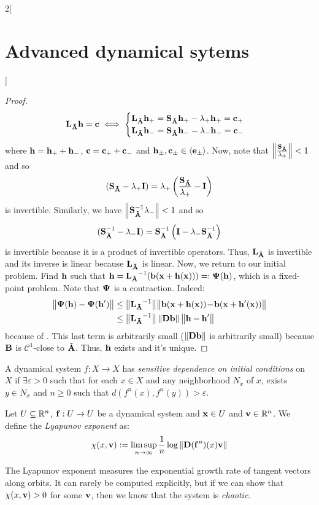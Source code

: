 \documentclass[../../../main_math.tex]{subfiles}
\begin{document}
\begin{multicols}{2}[\section{Advanced dynamical sytems}]
\begin{proof}
    $$
      \vf{L}_{\vf{\tilde{A}}}\vf{h}=\vf{c}\iff \begin{cases}
        \vf{L}_{\vf{\tilde{A}}}\vf{h}_+=\vf{S}_{\vf{\tilde{A}}}\vf{h}_+-\lambda_+\vf{h}_+=\vf{c}_+ \\
        \vf{L}_{\vf{\tilde{A}}}\vf{h}_-=\vf{S}_{\vf{\tilde{A}}}\vf{h}_--\lambda_-\vf{h}_-=\vf{c}_-
      \end{cases}
    $$
    where $\vf{h}=\vf{h}_++\vf{h}_-$, $\vf{c}=\vf{c}_++\vf{c}_-$ and $\vf{h}_\pm,\vf{c}_\pm\in \langle \vf{e}_\pm\rangle$. Now, note that $\norm{\frac{\vf{S}_{\vf{\tilde{A}}}}{\lambda_+}}<1$ and so
    $$
      (\vf{S}_{\vf{\tilde{A}}}-\lambda_+\vf{I})=\lambda_+\left(\frac{\vf{S}_{\vf{\tilde{A}}}}{\lambda_+}-\vf{I}\right)
    $$
    is invertible. Similarly, we have $\norm{\vf{S}_{\vf{\tilde{A}}}^{-1}\lambda_-}<1$ and so
    $$
      (\vf{S}_{\vf{\tilde{A}}}^{-1}-\lambda_-\vf{I})=\vf{S}_{\vf{\tilde{A}}}^{-1}\left(\vf{I}-\lambda_-\vf{S}_{\vf{\tilde{A}}}^{-1}\right)
    $$
    is invertible because it is a product of invertible operators. Thus, $\vf{L}_{\vf{\tilde{A}}}$ is invertible and its inverse is linear because $\vf{L}_{\vf{\tilde{A}}}$ is linear. Now, we return to our initial problem. Find $\vf{h}$ such that $\vf{h}= {\vf{L}_{\vf{\tilde{A}}}}^{-1}(\vf{b}(\vf{x}+\vf{h}(\vf{x})))=:\vf\Psi(\vf{h})$, which is a fixed-point problem. Note that $\vf\Psi$ is a contraction. Indeed:
    \begin{align*}
      \norm{\vf\Psi(\vf{h})-\vf\Psi(\vf{h}')} & \leq \norm{{\vf{L}_{\vf{\tilde{A}}}}^{-1}}\!\norm{\vf{b}(\vf{x}+\vf{h}(\vf{x}))\!-\!\vf{b}(\vf{x}+\vf{h}'(\vf{x}))} \\
                                              & \leq \norm{{\vf{L}_{\vf{\tilde{A}}}}^{-1}}\norm{\vf{Db}}\norm{\vf{h}-\vf{h}'}
    \end{align*}
    because of . This last term is arbitrarily small ($\norm{\vf{Db}}$ is arbitrarily small) because $\vf{B}$ is $\mathcal{C}^1$-close to $\vf{\tilde{A}}$. Thus, $\vf{h}$ exists and it's unique.
  \end{proof}
  \begin{definition}
    A dynamical system $f : X\rightarrow X$ has \emph{sensitive dependence on initial conditions} on $X$ if $\exists\varepsilon >0$ such that for each $x\in X$ and any neighborhood $N_x$ of $x$, exists $y \in N_x$ and $n \geq  0$ such that $d(f^n(x),f^n(y)) > \varepsilon$.
  \end{definition}
  \begin{definition}
    Let $U\subseteq \RR^n$, $\vf{f}:U\to U$ be a dynamical system and $\vf{x}\in U$ and $\vf{v}\in\RR^n$. We define the \emph{Lyapunov exponent} as:
    $$
      \chi(x,\vf{v}):=\limsup_{n\to\infty}\frac{1}{n}\log\norm{\vf{D}(\vf{f}^n)(x)\vf{v}}
    $$
  \end{definition}
  \begin{remark}
    The Lyapunov exponent measures the exponential growth rate of tangent vectors along orbits. It can rarely be computed explicitly, but if we can show that $\chi(x,\vf{v})>0$ for some $\vf{v}$, then we know that the system is \emph{chaotic}.
  \end{remark}

\end{multicols}
\end{document}
